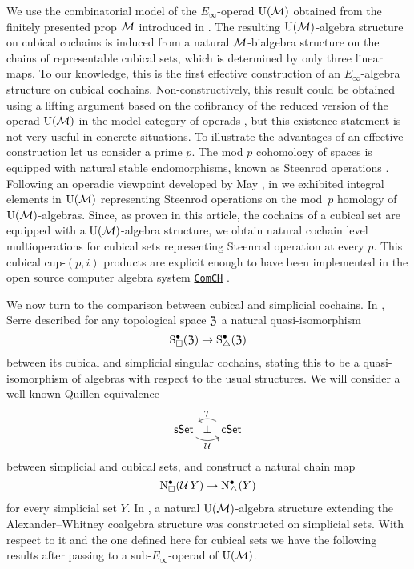 We use the combinatorial model of the $E_\infty$-operad ${\operatorname{U}(\mathcal{M})}$ obtained from the finitely presented prop $\mathcal{M}$ introduced in \cite{medina2020prop1}.
The resulting ${\operatorname{U}(\mathcal{M})}$-algebra structure on cubical cochains is induced from a natural $\mathcal{M}$-bialgebra structure on the chains of representable cubical sets, which is determined by only three linear maps.
To our knowledge, this is the first effective construction of an $E_\infty$-algebra structure on cubical cochains.
Non-constructively, this result could be obtained using a lifting argument based on the cofibrancy of the reduced version of the operad ${\operatorname{U}(\mathcal{M})}$ in the model category of operads \cite{hinich1997homological, berger2003modelcategory}, but this existence statement is not very useful in concrete situations.
To illustrate the advantages of an effective construction let us consider a prime $p$.
The mod $p$ cohomology of spaces is equipped with natural stable endomorphisms, known as Steenrod operations \cite{steenrod1962cohomology}.
Following an operadic viewpoint developed by May \cite{may1970general}, in \cite{medina2021may_st} we exhibited integral elements in ${\operatorname{U}(\mathcal{M})}$ representing Steenrod operations on the mod~$p$ homology of ${\operatorname{U}(\mathcal{M})}$-algebras.
Since, as proven in this article, the cochains of a cubical set are equipped with a ${\operatorname{U}(\mathcal{M})}$-algebra structure, we obtain natural cochain level multioperations for cubical sets representing Steenrod operation at every $p$.
This cubical cup-$(p,i)$ products are explicit enough to have been implemented in the open source computer algebra system \href{https://comch.readthedocs.io/en/latest/}{\texttt{ComCH}} \cite{medina2021comch}.

We now turn to the comparison between cubical and simplicial cochains.
In \cite[p. 442]{serre1951homologie}, Serre described for any topological space $\mathfrak{Z}$ a natural quasi-isomorphism
\begin{equation} \label{e:cs on singular cochains}
	\operatorname{S^{\bullet}_{\square}}(\mathfrak{Z}) \to \operatorname{S^{\bullet}_{\triangle}}(\mathfrak{Z})
\end{equation}
between its cubical and simplicial singular cochains, stating this to be a quasi-isomorphism of algebras with respect to the usual structures.
We will consider a well known Quillen equivalence
\[
\begin{tikzcd}[column sep=0]
	\sSet \arrow[rr, "\cubify"', bend right] & \perp & \arrow[ll,"\triangulate"', bend right] \cSet
\end{tikzcd}
\]
between simplicial and cubical sets, and construct a natural chain map
\begin{equation} \label{e:intro main map}
	\operatorname{N^{\bullet}_{\square}}(\operatorname{\mathcal{U}} Y) \to \operatorname{N^{\bullet}_{\triangle}}(Y)
\end{equation}
for every simplicial set $Y$.
In \cite{medina2020prop1}, a natural ${\operatorname{U}(\mathcal{M})}$-algebra structure extending the Alexander--Whitney coalgebra structure was constructed on simplicial sets.
With respect to it and the one defined here for cubical sets we have the following results after passing to a sub-$E_\infty$-operad of ${\operatorname{U}(\mathcal{M})}$.

